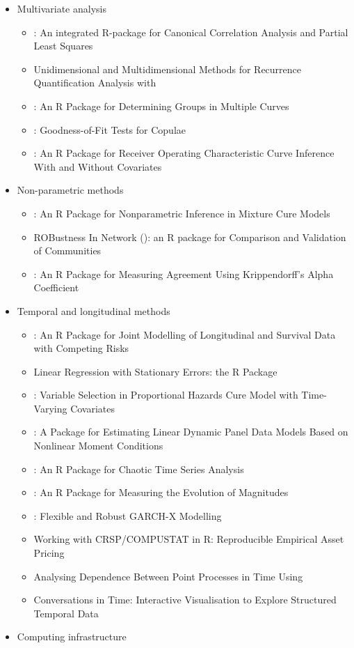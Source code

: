 \begin{itemize}
\tightlist
\item
  Multivariate analysis

  \begin{itemize}
  \tightlist
  \item
    : An integrated R-package for Canonical Correlation Analysis and Partial Least Squares
  \item
    Unidimensional and Multidimensional Methods for Recurrence Quantification Analysis with 
  \item
    : An R Package for Determining Groups in Multiple Curves
  \item
    : Goodness-of-Fit Tests for Copulae
  \item
    : An R Package for Receiver Operating Characteristic Curve Inference With and Without Covariates
  \end{itemize}
\item
  Non-parametric methods

  \begin{itemize}
  \tightlist
  \item
    : An R Package for Nonparametric Inference in Mixture Cure Models
  \item
    ROBustness In Network (): an R package for Comparison and Validation of Communities
  \item
    : An R Package for Measuring Agreement Using Krippendorff's Alpha Coefficient
  \end{itemize}
\item
  Temporal and longitudinal methods

  \begin{itemize}
  \tightlist
  \item
    : An R Package for Joint Modelling of Longitudinal and Survival Data with Competing Risks
  \item
    Linear Regression with Stationary Errors: the R Package 
  \item
    : Variable Selection in Proportional Hazards Cure Model with Time-Varying Covariates
  \item
    : A Package for Estimating Linear Dynamic Panel Data Models Based on Nonlinear Moment Conditions
  \item
    : An R Package for Chaotic Time Series Analysis
  \item
    : An R Package for Measuring the Evolution of Magnitudes
  \item
    : Flexible and Robust GARCH-X Modelling
  \item
    Working with CRSP/COMPUSTAT in R: Reproducible Empirical Asset Pricing
  \item
    Analysing Dependence Between Point Processes in Time Using 
  \item
    Conversations in Time: Interactive Visualisation to Explore Structured Temporal Data
  \end{itemize}
\item
  Computing infrastructure


\end{itemize}
